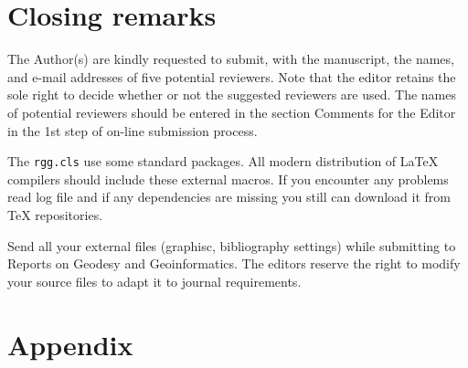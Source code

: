\documentclass{rgg}
\begin{document}
  \section{Closing remarks}
    The Author(s) are kindly requested to submit, with the manuscript, 
    the names, and e-mail addresses of five potential reviewers. Note 
    that the editor retains the sole right to decide whether or not the 
    suggested reviewers are used. The names of potential reviewers should 
    be entered in the section Comments for the Editor in the 1st step of 
    on-line submission process.

    The \texttt{rgg.cls} use some standard packages.
    All modern distribution of \LaTeX{} compilers should include
    these external macros.
    If you encounter any problems read log file and if any dependencies are 
    missing you still can download it from \TeX{} repositories.

    Send all your external files (graphisc, bibliography settings) while
    submitting to Reports on Geodesy and Geoinformatics.
    The editors reserve the right to modify your source files to adapt it to 
    journal requirements.


    


    \clearpage
  \section*{Appendix}
\end{document}
